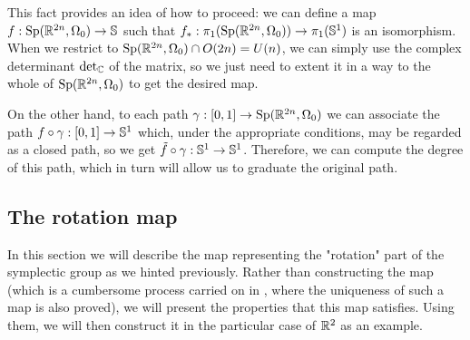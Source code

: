 This fact provides an idea of how to proceed: we can define a map $f : \text{Sp}(\mathbb{R}^{2n},\Omega_0) \rightarrow \mathbb{S}$ such that $f_{\ast} : \pi_1(\text{Sp}(\mathbb{R}^{2n},\Omega_0)) \rightarrow \pi_1(\mathbb{S}^1)$ is an isomorphism. When we restrict to $\text{Sp}(\mathbb{R}^{2n},\Omega_0) \cap O(2n) = U(n)$, we can simply use the complex determinant $\text{det}_{\mathbb{C}}$ of the matrix, so we just need to extent it in a way to the whole of $\text{Sp}(\mathbb{R}^{2n},\Omega_0)$ to get the desired map.

On the other hand, to each path $\gamma : [0,1] \rightarrow \text{Sp}(\mathbb{R}^{2n},\Omega_0)$ we can associate the path $f \circ \gamma : [0,1] \rightarrow \mathbb{S}^1$ which, under the appropriate conditions, may be regarded as a closed path, so we get $\tilde{f} \circ \gamma : \mathbb{S}^1 \rightarrow \mathbb{S}^1$. Therefore, we can compute the degree of this path, which in turn will allow us to graduate the original path.

\subsection{The rotation map}

In this section we will describe the map representing the "rotation" part of the symplectic group as we hinted previously. Rather than constructing the map (which is a cumbersome process carried on in \cite{gutt2012conley}, where the uniqueness of such a map is also proved), we will present the properties that this map satisfies. Using them, we will then construct it in the particular case of $\mathbb{R}^2$ as an example.

